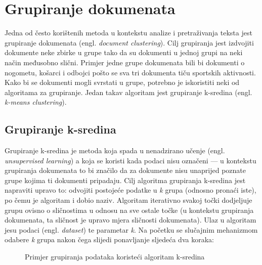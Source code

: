 \documentclass[times, utf8, zavrsni]{fer}
\begin{document}
\section{Grupiranje dokumenata}
Jedna od često korištenih metoda u kontekstu analize i pretraživanja teksta jest grupiranje dokumenata (engl. \textit{document clustering}). Cilj grupiranja jest izdvojiti dokumente neke zbirke u grupe tako da su dokumenti u jednoj grupi na neki način međusobno slični. Primjer jedne grupe dokumenata bili bi dokumenti o nogometu, košarci i odbojci pošto se sva tri dokumenta tiču sportskih aktivnosti. Kako bi se dokumenti mogli svrstati u grupe, potrebno je iskoristiti neki od algoritama za grupiranje. Jedan takav algoritam jest grupiranje k-sredina (engl. \textit{k-means clustering}).

\subsection{Grupiranje k-sredina}
\label{k_means_clustering}
Grupiranje k-sredina je metoda koja spada u nenadzirano učenje (engl. \textit{unsupervised learning}) a koja se koristi kada podaci nisu označeni — u kontekstu grupiranja dokumenata to bi značilo da za dokumente nisu unaprijed poznate grupe kojima ti dokumenti pripadaju. Cilj algoritma grupiranja k-sredina jest napraviti upravo to: odvojiti postojeće podatke u \textit{k} grupa (odnosno pronaći iste), po čemu je algoritam i dobio naziv. Algoritam iterativno svakoj točki dodjeljuje grupu ovisno o sličnostima u odnosu na sve ostale točke (u kontekstu grupiranja dokumenata, ta sličnost je upravo mjera sličnosti dokumenata).
Ulaz u algoritam jesu podaci (engl. \textit{dataset}) te parametar \textit{k}.
Na početku se slučajnim mehanizmom odabere \textit{k} grupa nakon čega slijedi ponavljanje sljedeća dva koraka:

\begin{figure}[h]
\centering    
\def\svgwidth{\columnwidth}

\caption{Primjer grupiranja podataka koristeći algoritam k-sredina}
\label{img:clustering}
\end{figure}
\end{document}
